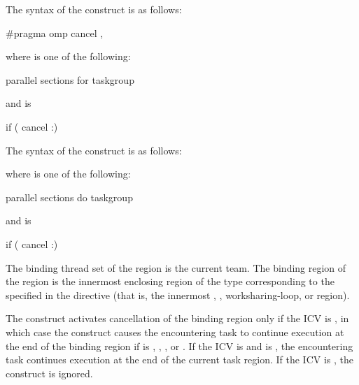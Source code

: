 \syntax
\begin{ccppspecific}
The syntax of the  construct is as follows:

\begin{ompcPragma}
#pragma omp cancel \plc{construct-type-clause [ [},\plc{] if-clause] new-line}
\end{ompcPragma}

\begin{samepage}
where  is one of the following:

\begin{indentedcodelist}
parallel
sections
for
taskgroup
\end{indentedcodelist}
\end{samepage}

and  is
\begin{indentedcodelist}
if (\plc{[} cancel :\plc{] scalar-expression})
\end{indentedcodelist}
\end{ccppspecific}

\begin{fortranspecific}
The syntax of the  construct is as follows:



\begin{samepage}
where  is one of the following:
\begin{indentedcodelist}
parallel
sections
do
taskgroup
\end{indentedcodelist}
\end{samepage}

and  is
\begin{indentedcodelist}
if (\plc{[} cancel :\plc{] scalar-logical-expression})
\end{indentedcodelist}
\end{fortranspecific}


\binding
The binding thread set of the  region is the current team.
The binding region of the  region is the innermost enclosing 
region of the type corresponding to the 
specified in the directive (that is, the innermost , 
, worksharing-loop, or  region).

\descr
The  construct activates cancellation of the binding region 
only if the  ICV is , in which case the  
construct causes the encountering task to continue execution at the end of the 
binding region if  is , , 
, or . If the  ICV is  and 
 is , the encountering task 
continues execution at the end of the current task region. If the 
 ICV is , the  construct is ignored.

